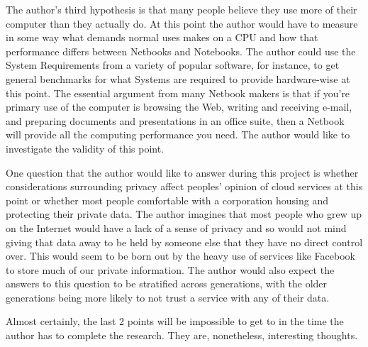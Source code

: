 The author's third hypothesis is that many people believe they use more of their
computer than they actually do.  At this point the author would have to measure
in some way what demands normal uses makes on a CPU and how that performance
differs between Netbooks and Notebooks.  The author could use the System
Requirements from a variety of popular software, for instance, to get general
benchmarks for what Systems are required to provide hardware-wise at this point.
The essential argument from many Netbook makers is that if you're primary use of
the computer is browsing the Web, writing and receiving e-mail, and preparing
documents and presentations in an office suite, then a Netbook will provide all
the computing performance you need.  The author would like to investigate the
validity of this point.

One question that the author would like to answer during this project is whether
considerations surrounding privacy affect peoples' opinion of cloud services at
this point or whether most people comfortable with a corporation housing and
protecting their private data.  The author imagines that most people who grew up
on the Internet would have a lack of a sense of privacy and so would not mind
giving that data away to be held by someone else that they have no direct
control over.  This would seem to be born out by the heavy use of services like
Facebook to store much of our private information.  The author would also expect
the answers to this question to be stratified across generations, with the older
generations being more likely to not trust a service with any of their data.

Almost certainly, the last 2 points will be impossible to get to in the time the
author has to complete the research.  They are, nonetheless, interesting thoughts. 
